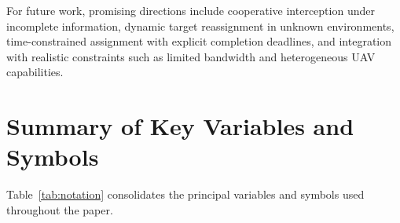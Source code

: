 \documentclass[lettersize,journal]{IEEEtran}
\begin{document}
For future work, promising directions include cooperative interception under incomplete
information, dynamic target reassignment in unknown environments, time-constrained assignment
with explicit completion deadlines, and integration with realistic constraints such as
limited bandwidth and heterogeneous UAV capabilities.






\FloatBarrier
\newpage


\appendices
\section{Summary of Key Variables and Symbols}
\label{app:notation}

Table~\ref{tab:notation} consolidates the principal variables and symbols used throughout the paper.
\end{document}
